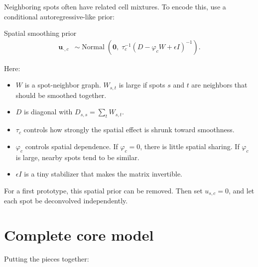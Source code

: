 \documentclass[11pt]{article}
\newcommand{\Normal}{\operatorname{Normal}}
\begin{document}
Neighboring spots often have related cell mixtures.  To encode this, use a conditional autoregressive-like prior:

\begin{mathbox}{Spatial smoothing prior}
\begin{align}
\boldsymbol{u}_{\cdot,c}
&\sim \Normal\left(\boldsymbol{0},\; \tau_c^{-1}(D-\varphi_c W+\epsilon I)^{-1}\right). \label{eq:car}
\end{align}
\end{mathbox}

Here:

\begin{itemize}[leftmargin=2em]
    \item \(W\) is a spot-neighbor graph.  \(W_{s,t}\) is large if spots \(s\) and \(t\) are neighbors that should be smoothed together.
    \item \(D\) is diagonal with \(D_{s,s}=\sum_t W_{s,t}\).
    \item \(\tau_c\) controls how strongly the spatial effect is shrunk toward smoothness.
    \item \(\varphi_c\) controls spatial dependence.  If \(\varphi_c=0\), there is little spatial sharing.  If \(\varphi_c\) is large, nearby spots tend to be similar.
    \item \(\epsilon I\) is a tiny stabilizer that makes the matrix invertible.
\end{itemize}

For a first prototype, this spatial prior can be removed.  Then set \(u_{s,c}=0\), and let each spot be deconvolved independently.

\section{Complete core model}

Putting the pieces together:
\end{document}
